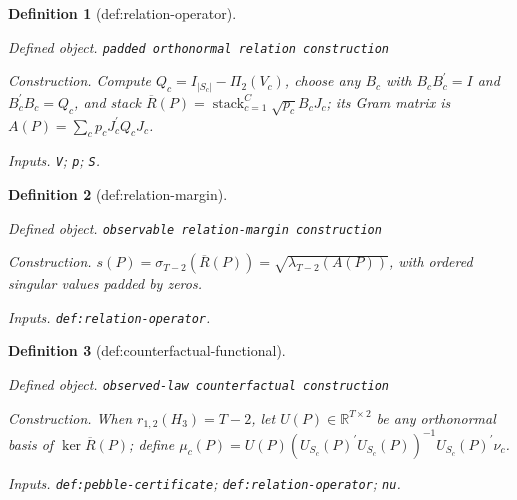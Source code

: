 \documentclass{article}
\newtheorem{definition}{Definition}
\begin{document}
\begin{definition}[def:relation-operator]\label{def:relation-operator}
\par\smallskip\noindent\emph{Defined object.} \texttt{padded orthonormal relation construction}
\par\smallskip\noindent\emph{Construction.} Compute \(Q_c=I_{|S_c|}-\Pi_2(V_c)\), choose any \(B_c\) with \(B_cB_c^{\prime}=I\) and \(B_c^{\prime}B_c=Q_c\), and stack \(\overline R(P)=\operatorname{stack}_{c=1}^C\sqrt{p_c}B_cJ_c\); its Gram matrix is \(A(P)=\sum_cp_cJ_c^{\prime}Q_cJ_c\).
\par\smallskip\noindent\emph{Inputs.} \texttt{V}; \texttt{p}; \texttt{S}.
\end{definition}

\begin{definition}[def:relation-margin]\label{def:relation-margin}
\par\smallskip\noindent\emph{Defined object.} \texttt{observable relation-\allowbreak{}margin construction}
\par\smallskip\noindent\emph{Construction.} \(s(P)=\sigma_{T-2}(\overline R(P))=\sqrt{\lambda_{T-2}(A(P))}\), with ordered singular values padded by zeros.
\par\smallskip\noindent\emph{Inputs.} \texttt{def:\allowbreak{}relation-\allowbreak{}operator}.
\end{definition}

\begin{definition}[def:counterfactual-functional]\label{def:counterfactual-functional}
\par\smallskip\noindent\emph{Defined object.} \texttt{observed-\allowbreak{}law counterfactual construction}
\par\smallskip\noindent\emph{Construction.} When \(r_{1,2}(H_3)=T-2\), let \(U(P)\in\mathbb R^{T\times2}\) be any orthonormal basis of \(\ker\overline R(P)\); define \(\mu_c(P)=U(P)(U_{S_c}(P)^{\prime}U_{S_c}(P))^{-1}U_{S_c}(P)^{\prime}\nu_c\).
\par\smallskip\noindent\emph{Inputs.} \texttt{def:\allowbreak{}pebble-\allowbreak{}certificate}; \texttt{def:\allowbreak{}relation-\allowbreak{}operator}; \texttt{nu}.
\end{definition}
\end{document}
